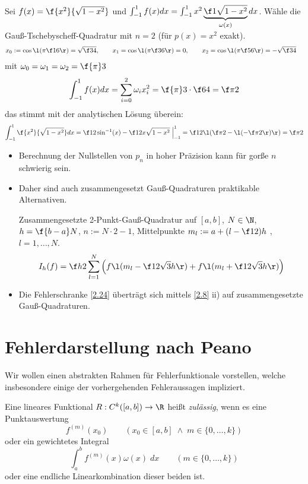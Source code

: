 \documentclass[11pt]{scrbook}
\begin{document}
\begin{ex*}
	Sei $f(x) = \f {x^2}{\sqrt{1-x^2}}$ und $\int_{-1}^1 f(x) dx = \int_{-1}^1 x^2 \underbrace{\f 1{\sqrt{1-x^2}}}_{\omega(x)} dx$.
	Wähle die Gauß-Tschebyscheff-Quadratur mit $n=2$ (für $p(x) = x^2$ exakt).
	\begin{align*}
		x_0 := \cos\l(\pi \f 16 \r) = \sqrt{\f 34}, \qquad x_1 &= \cos\l(\pi \f 36\r) = 0, \qquad x_2 = \cos \l(\pi\f 56\r) = -\sqrt{\f 34}
	\end{align*}
	mit $\omega_0 = \omega_1 = \omega_2 = \f {\pi}3$
	\[
		\int_{-1}^1 f(x) dx = \sum_{i=0}^2 \omega_i x_i^2 = \f {\pi}3 \cdot \f 64 = \f \pi2
	\]
	das stimmt mit der analytischen Lösung überein:
	\[
		\int_{-1}^1 \f {x^2}{\sqrt{1-x^2}} dx = \f 12 \sin^{-1}(x) - \f 12 x\sqrt{1-x^2} \; \Big|_{-1}^1 = \f 12 \l( \f \pi 2 - \l(-\f \pi 2\r) \r) = \f \pi2
	\]
\end{ex*}

\begin{nt*}
	\begin{itemize}
		\item
			Berechnung der Nullstellen von $p_n$ in hoher Präzision kann für gorße $n$ schwierig sein.
		\item
			Daher sind auch zusammengesetzt Gauß-Quadraturen praktikable Alternativen.
			\begin{ex*}
				Zusammengesetzte 2-Punkt-Gauß-Quadratur auf $[a,b]$, $N\in \N$, $h=\f {b-a}N$, $n:= N\cdot 2 - 1$, Mittelpunkte $m_l := a+ (l-\f 12)h$ , $l= 1,\dotsc, N$.
				\[
					I_h (f) = \f h2 \sum_{l=1}^N \Big( f\l(m_l- \f 1{2\sqrt 3} h\r) + f\l( m_l + \f 1{2\sqrt 3} h\r) \Big)
				\]
			\end{ex*}
		\item
			Die Fehlerschranke \ref{2.24} überträgt sich mittels \ref{2.8} ii) auf zusammengesetzte Gauß-Quadraturen.
	\end{itemize}
\end{nt*}


\section{Fehlerdarstellung nach Peano}

Wir wollen einen abstrakten Rahmen für Fehlerfunktionale vorstellen, welche insbesondere einige der vorhergehenden Fehleraussagen impliziert.

\begin{df}
	\label{2.27}
	Eine lineares Funktional $R : C^k([a,b]) \to \R$ heißt \emph{zulässig}, wenn es eine Punktauswertung 
	\[
		f^{(m)}(x_0)
		\qquad (x_0\in [a,b] \;\land\; m\in \{0,\dotsc,k\})
	\]
	oder ein gewichtetes Integral
	\[
		\int_a^b f^{(m)}(x) \omega(x) \; dx
		\qquad (m \in \{0,\dotsc,k\})
	\]
	oder eine endliche Linearkombination dieser beiden ist.
\end{df}
\end{document}

